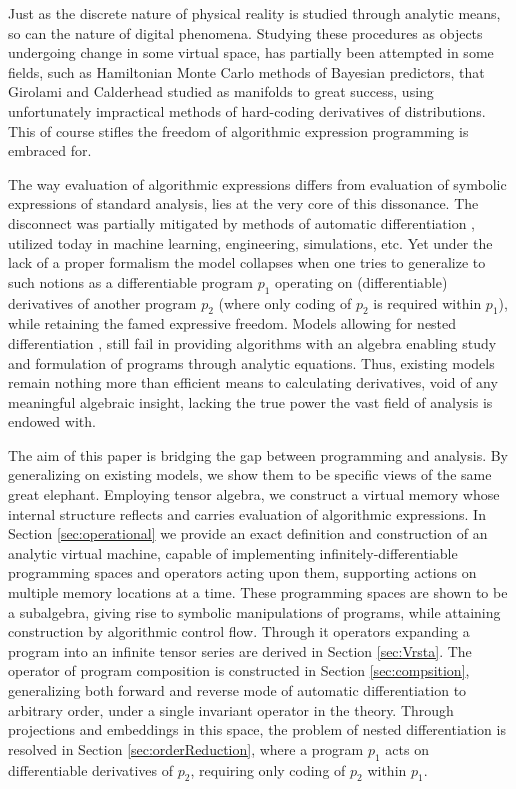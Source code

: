 \documentclass[preprint,12pt]{elsarticle}
\begin{document}
Just as the discrete nature of physical reality is studied through analytic means, so can the nature of digital phenomena. Studying these procedures as objects undergoing change in some virtual space, has partially been attempted in some fields, such as Hamiltonian Monte Carlo methods of Bayesian predictors, that Girolami and Calderhead \cite{StatMC} studied as manifolds to great success, using unfortunately impractical methods of hard-coding derivatives of distributions. This of course stifles the freedom of algorithmic expression programming is embraced for.

The way evaluation of algorithmic expressions differs from evaluation of symbolic expressions of standard analysis, lies at the very core of this dissonance. The disconnect was partially mitigated by methods of automatic differentiation \cite{AdSurvey}, utilized today in machine learning, engineering, simulations, etc. Yet under the lack of a proper formalism the model collapses \cite{AD2} when one tries to generalize to such notions as a differentiable program $p_1$ operating on (differentiable) derivatives of another program $p_2$ (where only coding of $p_2$ is required within $p_1$), while retaining the famed expressive freedom. 
Models allowing for nested differentiation \cite{AD1}, still fail in providing algorithms with an algebra enabling study and formulation of programs through analytic equations. Thus, existing models \cite{PcAD} \cite{ReverseAD} remain nothing more than efficient means to calculating derivatives, void of any meaningful algebraic insight, lacking the true power the vast field of analysis is endowed with.

The aim of this paper is bridging the gap between programming and analysis. By generalizing on existing models, we show them to be specific views of the same great elephant. Employing tensor algebra, we construct a virtual memory whose internal structure reflects and carries evaluation of algorithmic expressions. In Section \ref{sec:operational} we provide an exact definition and construction of an analytic virtual machine, capable of implementing infinitely-differentiable programming spaces and operators acting upon them, supporting actions on multiple memory locations at a time. These programming spaces are shown to be a subalgebra, giving rise to symbolic manipulations of programs, while attaining construction by algorithmic control flow. Through it operators expanding a program into an infinite tensor series are derived in Section \ref{sec:Vrsta}. The operator of program composition is constructed in Section \ref{sec:compsition}, generalizing both forward \cite{PcAD} and reverse \cite{ReverseAD} mode of automatic differentiation to arbitrary order, under a single invariant operator in the theory. Through projections and embeddings in this space, the problem of nested differentiation is resolved in Section \ref{sec:orderReduction}, where a program $p_1$ acts on differentiable derivatives of $p_2$, requiring only coding of $p_2$ within $p_1$.
\end{document}
